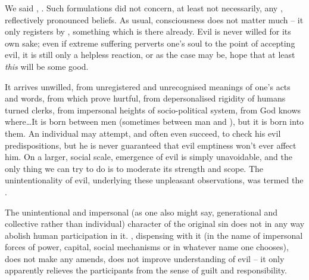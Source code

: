 \pa\label{pa:originalSinII}
We said , . Such
formulations  did not concern, at least not necessarily, any
, reflectively pronounced beliefs. As usual, 
consciousness does not matter much -- it only registers by ,
 something which is there already.
Evil is never willed for its own sake; even if extreme suffering perverts one's
soul to the point of accepting evil, it is still only a helpless reaction, or as
the case may be, hope that at least {\em this} will be some good.

It arrives unwilled, from unregistered and unrecognised meanings of one's acts
and words, from  which prove hurtful, from depersonalised
rigidity of humans turned clerks, from impersonal heights of socio-political
system, from God knows where\ldots It is born between men (sometimes between man
and ), but it is born into them. An individual may attempt,
and often even succeed, to check his evil predispositions, but he is never
guaranteed that evil emptiness won't ever affect him. On a larger, social scale,
emergence of evil is simply unavoidable, and the only thing we can try to do is
to moderate its strength and scope. The unintentionality of evil, underlying
these unpleasant observations, was termed the .


\pa The unintentional and impersonal (as one also might say, generational and
collective rather than individual) character of the original sin does not in any
way abolish human participation in it. , dispensing
with it (in the name of impersonal forces of power, capital, social mechanisms or in
whatever name one chooses), does not make any amends, does not improve
understanding of evil -- it only apparently relieves the participants from the
sense of guilt and responsibility.

